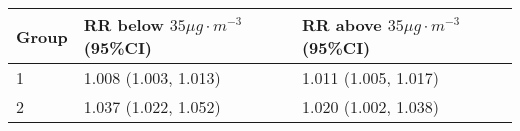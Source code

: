 \begin{tabular}{lll}
  \hline
Group & RR below $35 \mu g \cdot m^{-3}$ (95\%CI) & RR above $35 \mu g \cdot m^{-3}$ (95\%CI) \\ 
  \hline
   1 & 1.008 (1.003, 1.013) & 1.011 (1.005, 1.017) \\ 
     2 & 1.037 (1.022, 1.052) & 1.020 (1.002, 1.038) \\ 
   \hline
\end{tabular}

